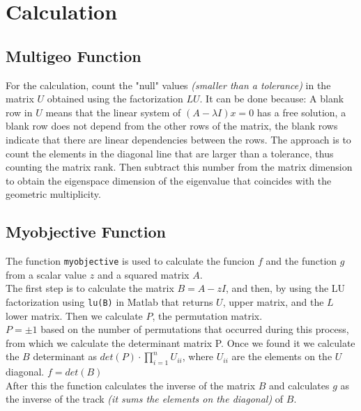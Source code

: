 \documentclass[12pt]{article}
\begin{document}
    \section{Calculation}
    \subsection{Multigeo Function}
    For the calculation, count the "null" values \textit{(smaller than a tolerance)} in the matrix $U$ obtained using the factorization $LU$. It can be done because:
    A blank row in $U$ means that the linear system of $(A-\lambda I)x = 0$ has a free solution, a blank row does not depend from the other rows of the matrix, the blank rows indicate that there are linear dependencies between the rows.
    The approach is to count the elements in the diagonal line that are larger than a tolerance, thus counting the matrix rank. Then subtract this number from the matrix dimension to obtain the eigenspace dimension of the eigenvalue that coincides with the geometric multiplicity.
    \subsection{Myobjective Function}
    The function \texttt{myobjective} is used to calculate the funcion $f$ and the function $g$ from a scalar value $z$ and a squared matrix $A$.\\
    The first step is to calculate the matrix $B = A - zI$, and then, by using the LU factorization using \texttt{lu(B)} in Matlab that returns  $U$, upper matrix, and the $L$ lower matrix. Then we calculate $P$, the permutation matrix. \\
    $P=\pm1$ based on the number of permutations that occurred during this process, from which we calculate the determinant matrix P. Once we found it we calculate the $B$ determinant as $det(P) \cdot \prod_{i=1}^{n} U_{ii}$, where $U_{ii}$ are the elements on the $U$ diagonal. $f = det(B)$\\
    After this the function calculates the inverse of the matrix $B$ and calculates $g$ as the inverse of the track \textit{(it sums the elements on the diagonal)} of $B$.
    \newpage
\end{document}
